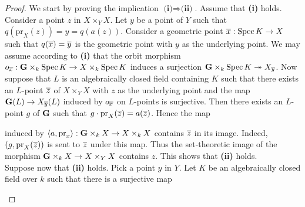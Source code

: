 \begin{proof}
We start by proving the implication $\textbf{(i)}\Rightarrow \textbf{(ii)}$. Assume that \textbf{(i)} holds. Consider a point $z$ in $X\times_YX$. Let $y$ be a point of $Y$ such that $q\left(\mathrm{pr}_X(z)\right) = y = q\left(a(z)\right)$. Consider a geometric point $\overline{x}:\mathrm{Spec}\, K\rightarrow X$ such that $q(\overline{x}) = \overline{y}$ is the geometric point with $y$ as the underlying point. We may assume according to \textbf{(i)} that the orbit morphism $o_{\overline{x}}:\mathbf{G}\times_k\mathrm{Spec}\, K\rightarrow X\times_k\mathrm{Spec}\, K$ induces a surjection $\mathbf{G}\times_k\mathrm{Spec}\, K\twoheadrightarrow X_{\overline{y}}$. Now suppose that $L$ is an algebraically closed field containing $K$ such that there exists an $L$-point $\overline{z}$ of $X\times_YX$ with $z$ as the underlying point and the map $\mathbf{G}(L) \rightarrow X_{\overline{y}}(L)$ induced by $o_{\overline{x}}$ on $L$-points is surjective. Then there exists an $L$-point $g$ of $\mathbf{G}$ such that $g\cdot \mathrm{pr}_X(\overline{z}) = a(\overline{z})$. Hence the map
\begin{center}
\end{center}
induced by $\langle a, \mathrm{pr}_x\rangle:\mathbf{G}\times_kX \rightarrow X\times_kX$ contains $\overline{z}$ in its image. Indeed, $\left(g,\mathrm{pr}_X(\overline{z})\right)$ is sent to $\overline{z}$ under this map. Thus the set-theoretic image of the morphism $\mathbf{G}\times_kX\rightarrow X\times_YX$ contains $z$. This shows that \textbf{(ii)} holds.\\
Suppose now that \textbf{(ii)} holds. Pick a point $y$ in $Y$. Let $K$ be an algebraically closed field over $k$ such that there is a surjective map
\begin{center}
\end{center}

\end{proof}
